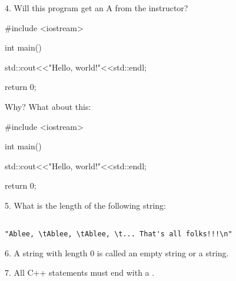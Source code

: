 4. Will this program get an A from the instructor?
\begin{console}
#include <iostream>

int main()
{
    std::cout<<"Hello, world!"<<std::endl;

    return 0;
}
\end{console}
Why? What about this:
\begin{console}
#include <iostream>

int main()
{


    std::cout<<"Hello, world!"<<std::endl;


    return 0;
}
\end{console}

5. What is the length of the following string:
\begin{verbatim}

"Ablee, \tAblee, \tAblee, \t... That's all folks!!!\n"

\end{verbatim}

6. A string with length 0 is called an empty string or a
   \underline{\mbox{}\hspace{1in}} string.

7. All C++ statements must end with a 
   \underline{\mbox{}\hspace{2in}}.
